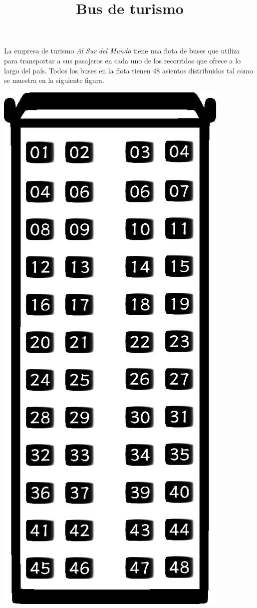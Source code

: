 \documentclass{oci}
\title{Bus de turismo}
\begin{document}
\begin{problemDescription}
  La empresa de turismo \emph{Al Sur del Mundo} tiene una flota de buses que
  utiliza para transportar a sus pasajeros en cada uno de los recorridos que
  ofrece a lo largo del país. 
  Todos los buses en la flota tienen 48 asientos distribuidos tal como se
  muestra en la siguiente figura.

  \begin{center}
  \includegraphics[angle=270,origin=c,scale=0.8]{bus.eps}

\end{center}
\end{problemDescription}
\end{document}
